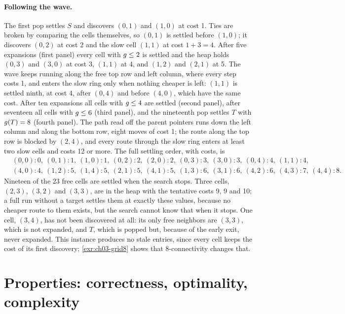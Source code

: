 \paragraph{Following the wave.} The first pop settles $S$ and discovers $(0,1)$ and $(1,0)$ at
cost 1. Ties are broken by comparing the cells themselves, so $(0,1)$ is settled before $(1,0)$;
it discovers $(0,2)$ at cost 2 and the slow cell $(1,1)$ at cost $1+3=4$. After five expansions
(first panel) every cell with $g\le2$ is settled and the heap holds $(0,3)$ and $(3,0)$ at
cost 3, $(1,1)$ at 4, and $(1,2)$ and $(2,1)$ at 5. The wave keeps running along the free top
row and left column, where every step costs 1, and enters the slow ring only when nothing
cheaper is left: $(1,1)$ is settled ninth, at cost 4, after $(0,4)$ and before $(4,0)$, which
have the same cost. After ten expansions all cells with $g\le4$ are settled (second
panel), after seventeen all cells with $g\le6$ (third panel), and the nineteenth pop
settles $T$ with $g(T)=8$ (fourth panel). The path read off the parent pointers runs down
the left column and along the bottom row, eight moves of cost 1; the route along the top row
is blocked by $(2,4)$, and every route through the slow ring enters at least two slow cells and
costs 12 or more. The full settling order, with costs, is
\[
\begin{aligned}
&(0,0)\!:0,\ (0,1)\!:1,\ (1,0)\!:1,\ (0,2)\!:2,\ (2,0)\!:2,\ (0,3)\!:3,\ (3,0)\!:3,\ (0,4)\!:4,\
(1,1)\!:4,\\
&(4,0)\!:4,\ (1,2)\!:5,\ (1,4)\!:5,\ (2,1)\!:5,\ (4,1)\!:5,\ (1,3)\!:6,\ (3,1)\!:6,\ (4,2)\!:6,\
(4,3)\!:7,\ (4,4)\!:8 .
\end{aligned}
\]
Nineteen of the 23 free cells are settled when the search stops. Three cells, $(2,3)$, $(3,2)$
and $(3,3)$, are in the heap with the tentative costs 9, 9 and 10; a full run without a target
settles them at exactly these values, because no cheaper route to them exists, but the search
cannot know that when it stops. One cell, $(3,4)$, has not been discovered at all: its only free
neighbors are $(3,3)$, which is not expanded, and $T$, which is popped but, because of the
early exit, never expanded. This instance produces no stale entries, since every cell keeps
the cost of its first discovery; \cref{exr:ch03-grid8} shows that 8-connectivity changes that.

\section{Properties: correctness, optimality, complexity}
\label{sec:ch03-properties}

